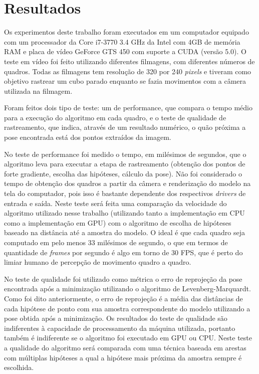 \chapter{Resultados}
\label{chapter:resultados}

Os experimentos deste trabalho foram executados em um computador equipado com um processador da Core i7-3770 3.4 GHz da Intel com 4GB de memória RAM e placa de vídeo GeForce GTS 450 com suporte a CUDA (versão 5.0). O teste em vídeo foi feito utilizando diferentes filmagens, com diferentes números de quadros. Todas as filmagens tem resolução de 320 por 240 \emph{pixels} e tiveram como objetivo rastrear um cubo parado enquanto se fazia movimentos com a câmera utilizada na filmagem.

Foram feitos dois tipo de teste: um de performance, que compara o tempo médio para a execução do algoritmo em cada quadro, e o teste de qualidade de rastreamento, que indica, através de um resultado numérico, o quão próxima a pose encontrada está dos pontos extraídos da imagem.

No teste de performance foi medido o tempo, em milésimos de segundos, que o algoritmo leva para executar a etapa de rastreamento (obtenção dos pontos de forte gradiente, escolha das hipóteses, cálculo da pose). Não foi considerado o tempo de obtenção dos quadros a partir da câmera e renderização do modelo na tela do computador, pois isso é bastante dependente dos respectivos \emph{drivers} de entrada e saída. Neste teste será feita uma comparação da velocidade do algoritmo utilizado nesse trabalho (utilizando tanto a implementação em CPU como a implementação em GPU) com o algoritmo de escolha de hipóteses baseado na distância até a amostra do modelo. O ideal é que cada quadro seja computado em pelo menos 33 milésimos de segundo, o que em termos de quantidade de \emph{frames} por segundo é algo em torno de 30 FPS, que é perto do limiar humano de percepção de movimento quadro a quadro.

No teste de qualidade foi utilizado como métrica o erro de reprojeção da pose encontrada após a minimização utilizando o algoritmo de Levenberg-Marquardt. Como foi dito anteriormente, o erro de reprojeção é a média das distâncias de cada hipótese de ponto com sua amostra correspondente do modelo utilizando a pose obtida após a minimização. Os resultados do teste de qualidade são indiferentes à capacidade de processamento da máquina utilizada, portanto também é indiferente se o algoritmo foi executado em GPU ou CPU. Neste teste a qualidade do algoritmo será comparada com uma técnica baseada em arestas com múltiplas hipóteses a qual a hipótese mais próxima da amostra sempre é escolhida.

